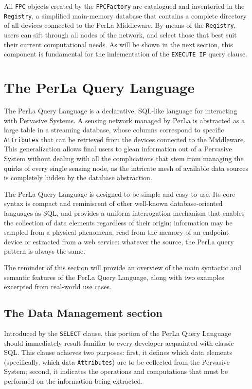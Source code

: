 All \texttt{FPC} objects created by the \texttt{FPCFactory} are catalogued and
inventoried in the \texttt{Registry}, a simplified main-memory database that
contains a complete directory of all devices connected to the PerLa Middleware.
By means of the \texttt{Registry}, users can sift through all nodes of the
network, and select those that best suit their current computational needs. As
will be shown in the next section, this component is fundamental for the
imlementation of the \texttt{EXECUTE IF} query clause.

\section{The PerLa Query Language}
\label{sec:language}

The PerLa Query Language is a declarative, SQL-like language for interacting
with Pervasive Systems. A sensing network managed by PerLa is abstracted as a
large table in a streaming database, whose columns correspond to specific
\texttt{Attributes} that can be retrieved from the devices connected to the
Middleware. This generalization allows final users to glean information out of
a Pervasive System without dealing with all the complications that stem from
managing the quirks of every single sensing node, as the intricate mesh of
available data sources is completely hidden by the database abstraction.

The PerLa Query Language is designed to be simple and easy to use. Its core
syntax is compact and reminiscent of other well-known database-oriented
languages as SQL, and provides a uniform interrogation mechanism that enables
the collection of data elements regardless of their origin; information may be
sampled from a physical phenomena, read from the memory of an endpoint device
or estracted from a web service: whatever the source, the PerLa query pattern
is always the same.

The reminder of this section will provide an overview of the main syntactic and
semantic features of the PerLa Query Language, along with two examples
excerpted from real-world use cases.

\subsection{The Data Management section}

Introduced by the \texttt{SELECT} clause, this portion of the PerLa Query
Language should immediately result familiar to every developer acquainted with
classic SQL. This clause achieves two purposes: first, it defines which data
elements (specifically, which data \texttt{Attributes}) are to be collected
from the Pervasive System; second, it indicates the operations and computations
that must be performed on the information being extracted.

